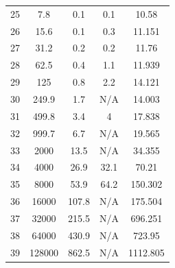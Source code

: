\begin{longtable}[H]{ccccc}
  25 & 7.8                  & 0.1           & 0.1            & 10.58                                               \\
  26 & 15.6                 & 0.1           & 0.3            & 11.151                                              \\
  27 & 31.2                 & 0.2           & 0.2            & 11.76                                               \\
  28 & 62.5                 & 0.4           & 1.1            & 11.939                                              \\
  29 & 125                  & 0.8           & 2.2            & 14.121                                              \\
  30 & 249.9                & 1.7           & N/A            & 14.003                                              \\
  31 & 499.8                & 3.4           & 4              & 17.838                                              \\
  32 & 999.7                & 6.7           & N/A            & 19.565                                              \\
  33 & 2000                 & 13.5          & N/A            & 34.355                                              \\
  34 & 4000                 & 26.9          & 32.1           & 70.21                                               \\
  35 & 8000                 & 53.9          & 64.2           & 150.302                                             \\
  36 & 16000                & 107.8         & N/A            & 175.504                                             \\
  37 & 32000                & 215.5         & N/A            & 696.251                                             \\
  38 & 64000                & 430.9         & N/A            & 723.95                                              \\
  39 & 128000               & 862.5         & N/A            & 1112.805                                            \\
\end{longtable}

